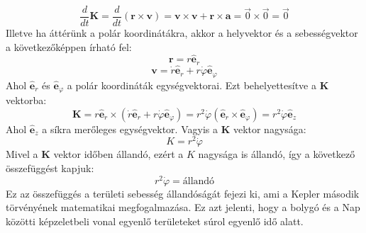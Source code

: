 \documentclass[a4paper,12pt]{article}
\begin{document}
\begin{equation}
    \frac{d}{dt} \mathbf{K} = \frac{d}{dt} (\mathbf{r} \times \mathbf{v}) = \mathbf{v} \times \mathbf{v} + \mathbf{r} \times \mathbf{a} = \vec{0} \times \vec{0} = \vec{0}
\end{equation}
Illetve ha áttérünk a polár koordinátákra, akkor a helyvektor és a sebességvektor a következőképpen írható fel:
\begin{equation}
    \mathbf{r} = r \hat{\mathbf{e}}_r
\end{equation}
\begin{equation}
    \mathbf{v} = \dot{r} \hat{\mathbf{e}}_r + r \dot{\varphi} \hat{\mathbf{e}}_{\varphi}
\end{equation}
Ahol $\hat{\mathbf{e}}_r$ és $\hat{\mathbf{e}}_{\varphi}$ a polár koordináták egységvektorai. Ezt behelyettesítve a $\mathbf{K}$ vektorba:
\begin{equation}
    \mathbf{K} = r \hat{\mathbf{e}}_r \times (\dot{r} \hat{\mathbf{e}}_r + r \dot{\varphi} \hat{\mathbf{e}}_{\varphi}) = r^2 \dot{\varphi} (\hat{\mathbf{e}}_r \times \hat{\mathbf{e}}_{\varphi}) = r^2 \dot{\varphi} \hat{\mathbf{e}}_z
\end{equation}
Ahol $\hat{\mathbf{e}}_z$ a síkra merőleges egységvektor. Vagyis a $\mathbf{K}$ vektor nagysága:
\begin{equation}
    K = r^2 \dot{\varphi}
\end{equation}
Mivel a $\mathbf{K}$ vektor időben állandó, ezért a $K$ nagysága is állandó, így a következő összefüggést kapjuk:
\begin{equation}
    r^2 \dot{\varphi} = \text{állandó}
\end{equation}
Ez az összefüggés a területi sebesség állandóságát fejezi ki, ami a Kepler második törvényének matematikai megfogalmazása. Ez azt jelenti, hogy a bolygó és a Nap közötti képzeletbeli vonal egyenlő területeket súrol egyenlő idő alatt.
\end{document}
